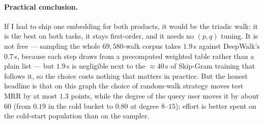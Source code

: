 \paragraph{Practical conclusion.}
If I had to ship one embedding for both products, it would be the triadic walk: it is the
best on both tasks, it stays first-order, and it needs no $(p,q)$ tuning.  It is not free
--- sampling the whole $69{,}580$-walk corpus takes $1.9$\,s against DeepWalk's $0.7$\,s,
because each step draws from a precomputed weighted table rather than a plain list --- but
$1.9$\,s is negligible next to the $\approx 40$\,s of Skip-Gram training that follows it,
so the choice costs nothing that matters in practice.  But the honest headline is that
on this graph the choice of random-walk strategy moves test MRR by at most $1.3$ points,
while the degree of the query user moves it by about $60$ (from $0.19$ in the cold bucket
to $0.80$ at degree $8$--$15$); effort is better spent on the cold-start population than
on the sampler.
